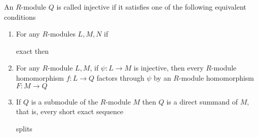 \begin{definition}
	An $R$-module $Q$ is called injective if it satisfies one of the following equivalent conditions
	\begin{enumerate}
		\item For any $R$-modules $L, M, N$ if 
		\begin{center}
		\end{center}
		
		exact then
		\begin{center}
		\end{center}
		
		\item For any $R$-module $L, M$, if $\psi: L \to M$ is injective, then every $R$-module homomorphism $f: L \to Q$ factors through $\psi$ by an $R$-module homomorphism $F: M \to Q$
		\begin{center}
		\end{center}
		
		\item If $Q$ is a submodule of the $R$-module $M$ then $Q$ is a direct summand of $M$, that is, every short exact sequence
				\begin{center}
		\end{center}
		splits
	\end{enumerate}
\end{definition}

